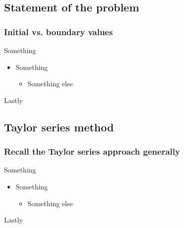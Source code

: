 \documentclass[hyperref={colorlinks=true}]{beamer}
\begin{document}
\subsection[Statement of the problem]{Statement of the problem}

\begin{frame}%
  \frametitle{Initial vs. boundary values}

  Something
  
  \vspace{0.3cm}
  
  \begin{itemize}
    \item Something
    \begin{itemize}
      \item Something else 
    \end{itemize}
  \end{itemize}
  
  Lastly

\end{frame}

\subsection[Taylor series method]{Taylor series method}

\begin{frame}%
  \frametitle{Recall the Taylor series approach generally}

  Something
  
  \vspace{0.3cm}
  
  \begin{itemize}
    \item Something
    \begin{itemize}
      \item Something else 
    \end{itemize}
  \end{itemize}
  
  Lastly

\end{frame}
\end{document}
